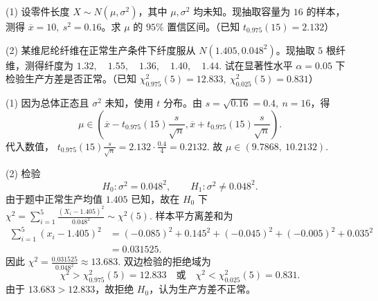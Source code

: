 \documentclass[lang=cn,11pt]{elegantbook}
\begin{document}
\begin{exercise}\label{exer:src-2014-spring-a-07}
(1) 设零件长度 \(X\sim N(\mu,\sigma^2)\)，其中 \(\mu,\sigma^2\) 均未知。现抽取容量为 \(16\) 的样本，测得 \(\overline x=10,\ s^2=0.16\)。求 \(\mu\) 的 \(95\%\) 置信区间。（已知 \(t_{0.975}(15)=2.132\)）\par
(2) 某维尼纶纤维在正常生产条件下纤度服从 \(N(1.405,0.048^2)\)。现抽取 \(5\) 根纤维，测得纤度为
\(
1.32,\quad 1.55,\quad 1.36,\quad 1.40,\quad 1.44.
\)
试在显著性水平 \(\alpha=0.05\) 下检验生产方差是否正常。（已知 \(\chi^2_{0.975}(5)=12.833,\ \chi^2_{0.025}(5)=0.831\)）
\end{exercise}
\begin{solution}
(1) 因为总体正态且 \(\sigma^2\) 未知，使用 \(t\) 分布。由 \(s=\sqrt{0.16}=0.4,\ n=16\)，得
\[
\mu\in
\left(
\overline x-t_{0.975}(15)\frac{s}{\sqrt n},
\overline x+t_{0.975}(15)\frac{s}{\sqrt n}
\right).
\]
代入数值，
\(
t_{0.975}(15)\frac{s}{\sqrt n}
=2.132\cdot\frac{0.4}{4}=0.2132.
\)
故
\(
\mu\in(9.7868,\ 10.2132).
\)

(2) 检验
\[
H_0\colon \sigma^2=0.048^2,\qquad
H_1\colon \sigma^2\ne0.048^2.
\]
由于题中正常生产均值 \(1.405\) 已知，故在 \(H_0\) 下
\(
\chi^2=\sum_{i=1}^{5}\frac{(X_i-1.405)^2}{0.048^2}\sim\chi^2(5).
\)
样本平方离差和为
\[
\begin{aligned}
\sum_{i=1}^{5}(x_i-1.405)^2
&=(-0.085)^2+0.145^2+(-0.045)^2+(-0.005)^2+0.035^2\\
&=0.031525.
\end{aligned}
\]
因此
\(
\chi^2=\frac{0.031525}{0.048^2}\approx13.683.
\)
双边检验的拒绝域为
\[
\chi^2>\chi^2_{0.975}(5)=12.833
\quad\text{或}\quad
\chi^2<\chi^2_{0.025}(5)=0.831.
\]
由于 \(13.683>12.833\)，故拒绝 \(H_0\)，认为生产方差不正常。
\end{solution}
\end{document}
